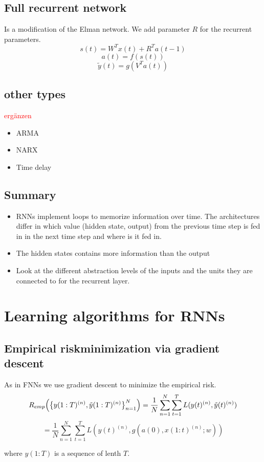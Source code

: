\documentclass[10pt,a4paper]{article}
\begin{document}
\subsection{Full recurrent network}
Is a modification of the Elman network. We add parameter $R$ for the recurrent parameters.
\[ s(t) = W^T x(t) + R^T a(t-1) \]
\[ a(t) = f(s(t)) \]
\[ \tilde{y}(t) = g(V^T a(t)) \]

\subsection{other types}
\textcolor{red}{ergänzen}
\begin{itemize}
\item ARMA
\item NARX
\item Time delay
\end{itemize}

\subsection{Summary}
\begin{itemize}
\item RNNs implement loops to memorize information over time. The architectures differ in which value (hidden state, output) from the previous time step is fed in in the next time step and where is it fed in.
\item The hidden states contains more information than the output
\item Look at the different abstraction levels of the inputs and the units they are connected to for the recurrent layer.
\end{itemize}

\section{Learning algorithms for RNNs}
\subsection{Empirical riskminimization via gradient descent}
As in FNNs we use gradient descent to minimize the empirical risk.
\[ R_{emp}\Bigl( \bigl\{ y(1:T)^{(n)}, \tilde{y}(1:T)^{(n)} \bigr\}_{n=1}^N  \Bigr) = 
\frac{1}{N} \sum_{n=1}^N \sum_{t=1}^T L(y(t)^{(n)},\tilde{y}(t)^{(n)} ) \]
\[ = \frac{1}{N} \sum_{n=1}^N \sum_{t=1}^T L(y(t)^{(n)},g(a(0),x(1:t)^{(n)};w) ) \]

where $y(1:T)$ is a sequence of lenth $T$. 
\end{document}
